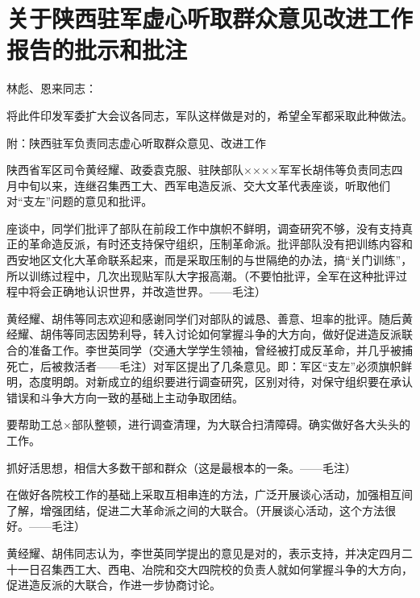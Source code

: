 \section[关于陕西驻军虚心听取群众意见改进工作报告的批示和批注（一九六七年四月二十三日）]{关于陕西驻军虚心听取群众意见改进工作报告的批示和批注}


林彪、恩来同志：

将此件印发军委扩大会议各同志，军队这样做是对的，希望全军都采取此种做法。

附：陕西驻军负责同志虚心听取群众意见、改进工作

陕西省军区司令黄经耀、政委袁克服、驻陕部队××××军军长胡伟等负责同志四月中旬以来，连继召集西工大、西军电造反派、交大文革代表座谈，听取他们对“支左”问题的意见和批评。

座谈中，同学们批评了部队在前段工作中旗帜不鲜明，调查研究不够，没有支持真正的革命造反派，有时还支持保守组织，压制革命派。批评部队没有把训练内容和西安地区文化大革命联系起来，而是采取压制的与世隔绝的办法，搞“关门训练”，所以训练过程中，几次出现贴军队大字报高潮。（不要怕批评，全军在这种批评过程中将会正确地认识世界，并改造世界。——毛注）

黄经耀、胡伟等同志欢迎和感谢同学们对部队的诚恳、善意、坦率的批评。随后黄经耀、胡伟等同志因势利导，转入讨论如何掌握斗争的大方向，做好促进造反派联合的准备工作。李世英同学（交通大学学生领袖，曾经被打成反革命，并几乎被捕死亡，后被救活者——毛注）对军区提出了几条意见。即：军区“支左”必须旗帜鲜明，态度明朗。对新成立的组织要进行调查研究，区别对待，对保守组织要在承认错误和斗争大方向一致的基础上主动争取团结。

要帮助工总×部队整顿，进行调查清理，为大联合扫清障碍。确实做好各大头头的工作。

抓好活思想，相信大多数干部和群众（这是最根本的一条。——毛注）

在做好各院校工作的基础上采取互相串连的方法，广泛开展谈心活动，加强相互间了解，增强团结，促进二大革命派之间的大联合。（开展谈心活动，这个方法很好。——毛注）

黄经耀、胡伟同志认为，李世英同学提出的意见是对的，表示支持，并决定四月二十一日召集西工大、西电、冶院和交大四院校的负责人就如何掌握斗争的大方向，促进造反派的大联合，作进一步协商讨论。

